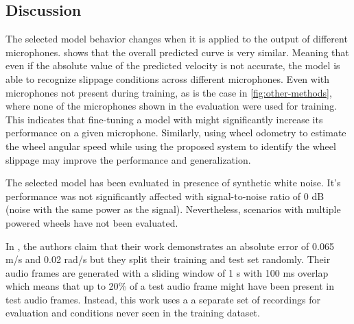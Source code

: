 \subsection{Discussion} \label{subsec:discussion}

\balance

The selected model behavior changes when it is applied to the output of
different microphones.  shows that the overall predicted
curve is very similar. Meaning that even if the absolute value of the predicted
velocity is not accurate, the model is able to recognize slippage conditions
across different microphones. Even with microphones not present during
training, as is the case in \cref{fig:other-methods}, where none of the
microphones shown in the evaluation were used for training. This indicates that
fine-tuning \cite{TL2016} a model with might significantly increase its
performance on a given microphone. Similarly, using wheel odometry to estimate
the wheel angular speed while using the proposed system to identify the wheel
slippage may improve the performance and generalization.


The selected model has been evaluated in presence of synthetic white noise.
It's performance was not significantly affected with signal-to-noise ratio of 0
dB (noise with the same power as the signal). Nevertheless, scenarios with
multiple powered wheels have not been evaluated. 


In  \cite{marchegiani2018a}, the authors claim that
their work demonstrates an absolute error of 0.065 m/s and 0.02 rad/s but they
split their training and test set randomly. Their audio frames are generated
with a sliding window of 1 s with 100 ms overlap which means that up to 20\% of
a test audio frame might have been present in test audio frames. Instead, this
work uses a a separate set of recordings for evaluation and conditions never
seen in the training dataset.

